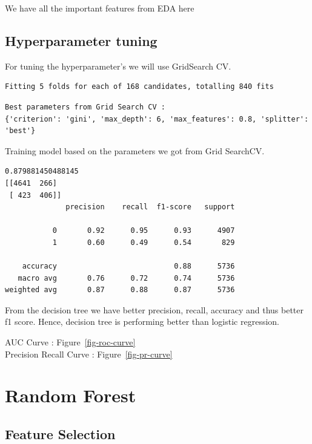 \documentclass[
  letterpaper,
  DIV=11,
  numbers=noendperiod]{scrartcl}
\begin{document}
We have all the important features from EDA here

\hypertarget{hyperparameter-tuning}{%
\subsection{Hyperparameter tuning}\label{hyperparameter-tuning}}

For tuning the hyperparameter's we will use GridSearch CV.

\begin{verbatim}
Fitting 5 folds for each of 168 candidates, totalling 840 fits
\end{verbatim}

\begin{verbatim}
Best parameters from Grid Search CV : 
{'criterion': 'gini', 'max_depth': 6, 'max_features': 0.8, 'splitter': 'best'}
\end{verbatim}

Training model based on the parameters we got from Grid SearchCV.

\begin{verbatim}
0.879881450488145
[[4641  266]
 [ 423  406]]
              precision    recall  f1-score   support

           0       0.92      0.95      0.93      4907
           1       0.60      0.49      0.54       829

    accuracy                           0.88      5736
   macro avg       0.76      0.72      0.74      5736
weighted avg       0.87      0.88      0.87      5736
\end{verbatim}

From the decision tree we have better precision, recall, accuracy and
thus better f1 score. Hence, decision tree is performing better than
logistic regression.

AUC Curve : Figure~\ref{fig-roc-curve}\\
Precision Recall Curve : Figure~\ref{fig-pr-curve}

\hypertarget{random-forest}{%
\section{Random Forest}\label{random-forest}}

\hypertarget{feature-selection-1}{%
\subsection{Feature Selection}\label{feature-selection-1}}
\end{document}
